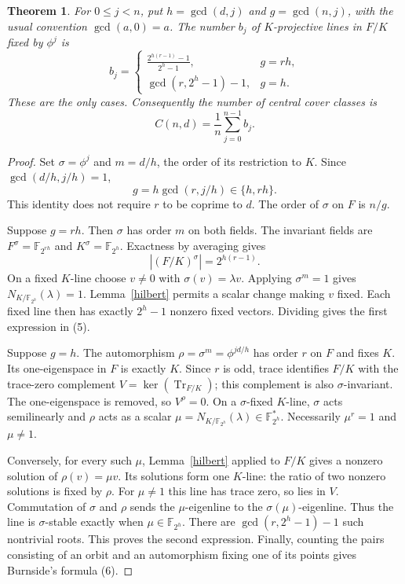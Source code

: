 \documentclass[11pt,a4paper]{article}
\newtheorem{theorem}{Theorem}
\newcommand{\F}{\mathbb F}
\newcommand{\Tr}{\operatorname{Tr}}
\begin{document}
\begin{theorem}\label{burnside}
For $0\le j<n$, put $h=\gcd(d,j)$ and $g=\gcd(n,j)$,
with the usual convention $\gcd(a,0)=a$. The number $b_j$ of
$K$-projective lines in $F/K$ fixed by $\phi^j$ is
\[
 b_j=\begin{cases}
 \displaystyle\frac{2^{h(r-1)}-1}{2^h-1},&g=rh,\\[3mm]
 \gcd(r,2^h-1)-1,&g=h.
 \end{cases}
                                                        \tag{5}
\]
These are the only cases. Consequently the number of central
cover classes is
\[
                         C(n,d)=\frac1n\sum_{j=0}^{n-1}b_j.
                                                        \tag{6}
\]
\end{theorem}
\begin{proof}
Set $\sigma=\phi^j$ and $m=d/h$, the order of its restriction
to $K$. Since $\gcd(d/h,j/h)=1$,
\[
       g=h\gcd(r,j/h)\in\{h,rh\}.
\]
This identity does not require $r$ to be coprime to $d$.
The order of $\sigma$ on $F$ is $n/g$.

Suppose $g=rh$. Then $\sigma$ has order $m$ on both fields.
The invariant fields are $F^\sigma=\F_{2^{rh}}$ and
$K^\sigma=\F_{2^h}$. Exactness by averaging gives
\[
              |(F/K)^\sigma|=2^{h(r-1)}.
\]
On a fixed $K$-line choose $v\ne0$ with $\sigma(v)=\lambda v$.
Applying $\sigma^m=1$ gives $N_{K/\F_{2^h}}(\lambda)=1$.
Lemma~\ref{hilbert} permits a scalar change making $v$ fixed.
Each fixed line then has exactly $2^h-1$ nonzero fixed vectors.
Dividing gives the first expression in (5).

Suppose $g=h$. The automorphism
$\rho=\sigma^m=\phi^{jd/h}$ has order $r$ on $F$ and fixes
$K$. Its one-eigenspace in $F$ is exactly $K$.
Since $r$ is odd, trace identifies $F/K$ with the trace-zero
complement $V=\ker(\Tr_{F/K})$; this complement is also
$\sigma$-invariant. The one-eigenspace is removed, so $V^\rho=0$.
On a $\sigma$-fixed $K$-line, $\sigma$ acts semilinearly and
$\rho$ acts as a scalar
$\mu=N_{K/\F_{2^h}}(\lambda)\in\F_{2^h}^*$.
Necessarily $\mu^r=1$ and $\mu\ne1$.

Conversely, for every such $\mu$, Lemma~\ref{hilbert} applied
to $F/K$ gives a nonzero solution of $\rho(v)=\mu v$.
Its solutions form one $K$-line: the ratio of two nonzero
solutions is fixed by $\rho$. For $\mu\ne1$ this line has
trace zero, so lies in $V$. Commutation of $\sigma$ and $\rho$
sends the $\mu$-eigenline to the $\sigma(\mu)$-eigenline.
Thus the line is $\sigma$-stable exactly when
$\mu\in\F_{2^h}$. There are $\gcd(r,2^h-1)-1$ such nontrivial
roots. This proves the second expression. Finally, counting
the pairs consisting of an orbit and an automorphism fixing
one of its points gives Burnside's formula (6).
\end{proof}
\end{document}
